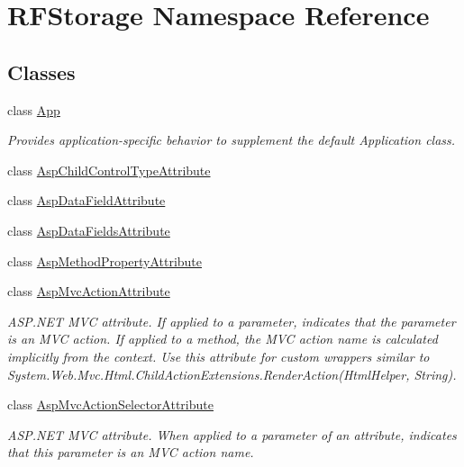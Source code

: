\hypertarget{namespace_r_f_storage}{}\section{R\+F\+Storage Namespace Reference}
\label{namespace_r_f_storage}
\subsection*{Classes}
\begin{DoxyCompactItemize}
\item 
class \mbox{\hyperlink{class_r_f_storage_1_1_app}{App}}
\begin{DoxyCompactList}\small\item\em Provides application-\/specific behavior to supplement the default Application class. \end{DoxyCompactList}\item 
class \mbox{\hyperlink{class_r_f_storage_1_1_asp_child_control_type_attribute}{Asp\+Child\+Control\+Type\+Attribute}}
\item 
class \mbox{\hyperlink{class_r_f_storage_1_1_asp_data_field_attribute}{Asp\+Data\+Field\+Attribute}}
\item 
class \mbox{\hyperlink{class_r_f_storage_1_1_asp_data_fields_attribute}{Asp\+Data\+Fields\+Attribute}}
\item 
class \mbox{\hyperlink{class_r_f_storage_1_1_asp_method_property_attribute}{Asp\+Method\+Property\+Attribute}}
\item 
class \mbox{\hyperlink{class_r_f_storage_1_1_asp_mvc_action_attribute}{Asp\+Mvc\+Action\+Attribute}}
\begin{DoxyCompactList}\small\item\em A\+S\+P.\+N\+ET M\+VC attribute. If applied to a parameter, indicates that the parameter is an M\+VC action. If applied to a method, the M\+VC action name is calculated implicitly from the context. Use this attribute for custom wrappers similar to {\ttfamily System.\+Web.\+Mvc.\+Html.\+Child\+Action\+Extensions.\+Render\+Action(\+Html\+Helper, String)}. \end{DoxyCompactList}\item 
class \mbox{\hyperlink{class_r_f_storage_1_1_asp_mvc_action_selector_attribute}{Asp\+Mvc\+Action\+Selector\+Attribute}}
\begin{DoxyCompactList}\small\item\em A\+S\+P.\+N\+ET M\+VC attribute. When applied to a parameter of an attribute, indicates that this parameter is an M\+VC action name. \end{DoxyCompactList}\item 

\end{DoxyCompactItemize}

